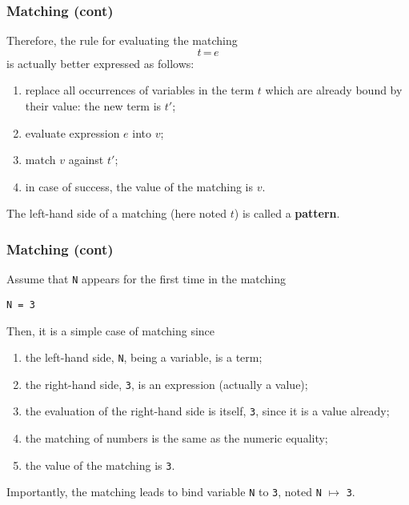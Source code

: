 %
\begin{frame}
\frametitle{Matching (cont)}

Therefore, the rule for evaluating the matching 
\[
t \, \texttt{=} \, e
\]
is actually better expressed as follows:
\begin{enumerate}

  \item replace all occurrences of variables in the term \(t\) which
    are already bound by their value: the new term is \(t'\);

  \item evaluate expression \(e\) into \(v\);

  \item match \(v\) against \(t'\);

  \item in case of success, the value of the matching is \(v\).

\end{enumerate}
The left-hand side of a matching (here noted \(t\)) is called a
\textbf{pattern}.

\end{frame}

%
\begin{frame}[containsverbatim]
\frametitle{Matching (cont)}

Assume that \texttt{N} appears for the first time in the matching
\begin{verbatim}
N = 3
\end{verbatim}
Then, it is a simple case of matching since
\begin{enumerate}

  \item the left-hand side, \texttt{N}, being a variable, is a term;

  \item the right-hand side, \texttt{3}, is an expression (actually a
    value);

  \item the evaluation of the right-hand side is itself, \texttt{3},
    since it is a value already;

  \item the matching of numbers is the same as the numeric equality;

  \item the value of the matching is \texttt{3}.

\end{enumerate}
Importantly, the matching leads to bind variable \texttt{N} to
\texttt{3}, noted \texttt{N} \(\mapsto\) \texttt{3}.

\end{frame}

